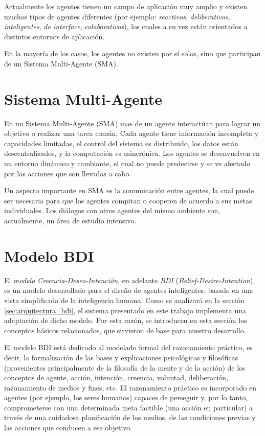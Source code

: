  Actualmente los agentes tienen un campo de aplicación muy amplio y
 existen muchos tipos de agentes diferentes (por ejemplo:
 \textit{reactivos}, \textit{deliberativos}, \textit{inteligentes},
 \textit{de interface}, \textit{colaborativos}), los cuales a su vez
 están orientados a distintos entornos de aplicación.
 
 En la mayoría de los casos, los agentes no existen por sí solos, sino
 que participan de un Sistema Multi-Agente (SMA).

\section{Sistema Multi-Agente}
\label{sec:sistema_multiagente}
 
 En un Sistema Multi-Agente (SMA) mas de un agente interactúan para
 lograr un objetivo o realizar una tarea común.
 Cada agente tiene información incompleta y capacidades limitadas, el
 control del sistema es distribuido, los datos están descentralizados,
 y la computación es asincrónica.
 Los agentes se desenvuelven en un entorno dinámico y cambiante, el
 cual no puede predecirse y se ve afectado por las acciones que son
 llevadas a cabo.
 
 Un aspecto importante en SMA es la comunicación entre agentes, la cual
 puede ser necesaria para que los agentes compitan o cooperen de
 acuerdo a sus metas individuales. 
 Los diálogos con otros agentes del mismo ambiente son, actualmente, un
 área de estudio intensivo.

\section{Modelo BDI}
\label{sec:modelo_bdi}
 
 El \textit{modelo Creencia-Deseo-Intención}, en adelante \textit{BDI}
 (\textit{Belief-Desire-Intention}), es un modelo desarrollado para el
 diseño de agentes inteligentes, basado en una vista simplificada de la
 inteligencia humana.
 Como se analizará en la sección \ref{sec:arquitectura_bdi}, el sistema
 presentado en este trabajo implementa una  adaptación de dicho modelo.
 Por esta razón, se introducen en esta sección los  conceptos básicos
 relacionados, que sirvieron de base para nuestro desarrollo.
 
 El modelo BDI está dedicado al modelado formal del razonamiento
 práctico, es  decir, la formalización de las bases y explicaciones
 psicológicas y filosóficas  (provenientes principalmente de la
 filosofía de la mente y de la acción) de los  conceptos de agente,
 acción, intención, creencia, voluntad, deliberación,  razonamiento de
 medios y fines, etc.
 El razonamiento práctico es incorporado  en agentes (por ejemplo, los
 seres humanos) capaces de perseguir y, por lo tanto,  comprometerse
 con una determinada meta factible (una acción en particular)  a través
 de una cuidadosa planificación de los medios, de las condiciones
 previas  y las acciones que conducen a ese objetivo.


